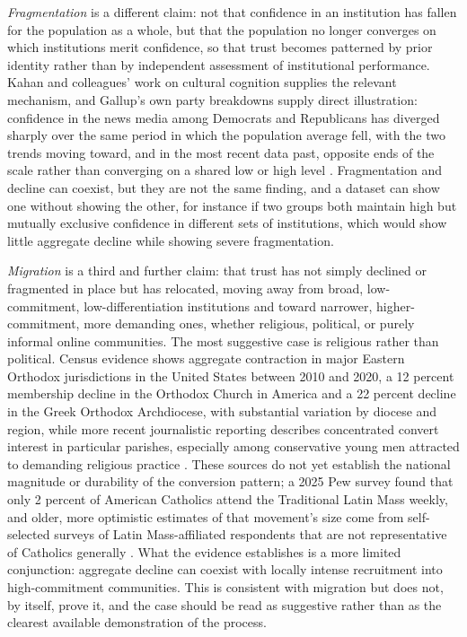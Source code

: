 \documentclass[11pt]{article}
\begin{document}
\emph{Fragmentation} is a different claim: not that confidence in an institution has fallen for the population as a whole, but that the population no longer converges on which institutions merit confidence, so that trust becomes patterned by prior identity rather than by independent assessment of institutional performance. Kahan and colleagues' work on cultural cognition supplies the relevant mechanism, and Gallup's own party breakdowns supply direct illustration: confidence in the news media among Democrats and Republicans has diverged sharply over the same period in which the population average fell, with the two trends moving toward, and in the most recent data past, opposite ends of the scale rather than converging on a shared low or high level \citep{kahan2011,gallup2025media}. Fragmentation and decline can coexist, but they are not the same finding, and a dataset can show one without showing the other, for instance if two groups both maintain high but mutually exclusive confidence in different sets of institutions, which would show little aggregate decline while showing severe fragmentation.

\emph{Migration} is a third and further claim: that trust has not simply declined or fragmented in place but has relocated, moving away from broad, low-commitment, low-differentiation institutions and toward narrower, higher-commitment, more demanding ones, whether religious, political, or purely informal online communities. The most suggestive case is religious rather than political. Census evidence shows aggregate contraction in major Eastern Orthodox jurisdictions in the United States between 2010 and 2020, a 12 percent membership decline in the Orthodox Church in America and a 22 percent decline in the Greek Orthodox Archdiocese, with substantial variation by diocese and region, while more recent journalistic reporting describes concentrated convert interest in particular parishes, especially among conservative young men attracted to demanding religious practice \citep{krindatch2020,nyt2025orthodox}. These sources do not yet establish the national magnitude or durability of the conversion pattern; a 2025 Pew survey found that only 2 percent of American Catholics attend the Traditional Latin Mass weekly, and older, more optimistic estimates of that movement's size come from self-selected surveys of Latin Mass-affiliated respondents that are not representative of Catholics generally \citep{pew2025catholic}. What the evidence establishes is a more limited conjunction: aggregate decline can coexist with locally intense recruitment into high-commitment communities. This is consistent with migration but does not, by itself, prove it, and the case should be read as suggestive rather than as the clearest available demonstration of the process.
\end{document}
